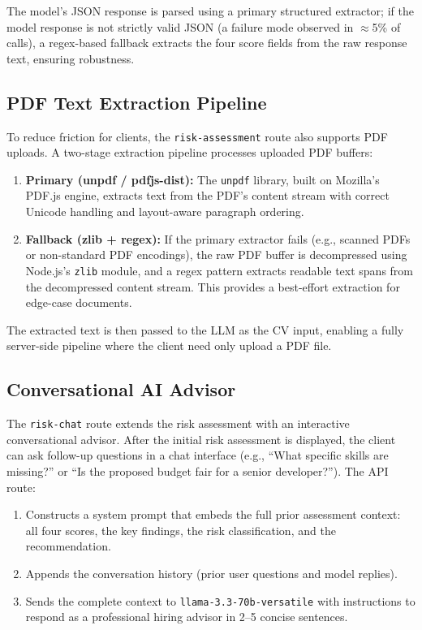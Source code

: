 The model's JSON response is parsed using a primary structured extractor; if the model response is not strictly valid JSON (a failure mode observed in $\approx$5\% of calls), a regex-based fallback extracts the four score fields from the raw response text, ensuring robustness.

\subsection{PDF Text Extraction Pipeline}

To reduce friction for clients, the \texttt{risk-assessment} route also supports PDF uploads. A two-stage extraction pipeline processes uploaded PDF buffers:

\begin{enumerate}
    \item \textbf{Primary (unpdf / pdfjs-dist):} The \texttt{unpdf} library, built on Mozilla's PDF.js engine, extracts text from the PDF's content stream with correct Unicode handling and layout-aware paragraph ordering.
    \item \textbf{Fallback (zlib + regex):} If the primary extractor fails (e.g., scanned PDFs or non-standard PDF encodings), the raw PDF buffer is decompressed using Node.js's \texttt{zlib} module, and a regex pattern extracts readable text spans from the decompressed content stream. This provides a best-effort extraction for edge-case documents.
\end{enumerate}

The extracted text is then passed to the LLM as the CV input, enabling a fully server-side pipeline where the client need only upload a PDF file.

\subsection{Conversational AI Advisor}

The \texttt{risk-chat} route extends the risk assessment with an interactive conversational advisor. After the initial risk assessment is displayed, the client can ask follow-up questions in a chat interface (e.g., ``What specific skills are missing?'' or ``Is the proposed budget fair for a senior developer?''). The API route:

\begin{enumerate}
    \item Constructs a system prompt that embeds the full prior assessment context: all four scores, the key findings, the risk classification, and the recommendation.
    \item Appends the conversation history (prior user questions and model replies).
    \item Sends the complete context to \texttt{llama-3.3-70b-versatile} with instructions to respond as a professional hiring advisor in 2--5 concise sentences.
\end{enumerate}

